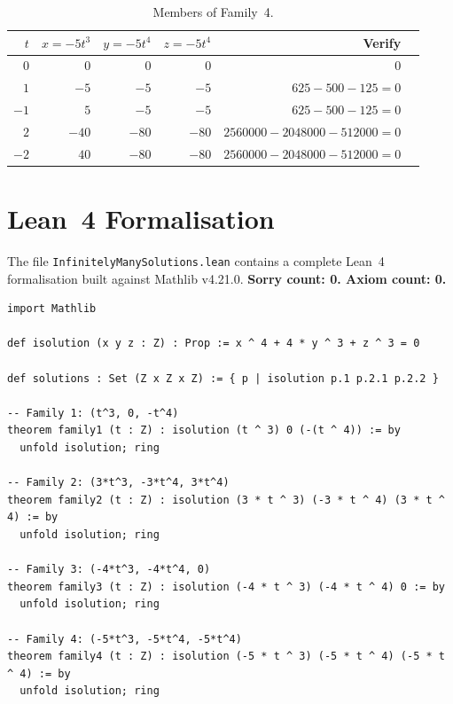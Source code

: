 \documentclass[12pt,a4paper]{article}
\theoremstyle{definition}
\begin{document}
\begin{table}[h]
\centering
\caption{Members of Family~4.}
\label{tab:family4}
\renewcommand{\arraystretch}{1.2}
\begin{tabular}{rrrrrc}
\toprule
$t$ & $x = -5t^3$ & $y = -5t^4$ & $z = -5t^4$ & Verify \\
\midrule
$0$  & $0$    & $0$    & $0$    & $0$ \\
$1$  & $-5$   & $-5$   & $-5$   & $625-500-125=0$ \\
$-1$ & $5$    & $-5$   & $-5$   & $625-500-125=0$ \\
$2$  & $-40$  & $-80$  & $-80$  & $2560000-2048000-512000=0$ \\
$-2$ & $40$   & $-80$  & $-80$  & $2560000-2048000-512000=0$ \\
\bottomrule
\end{tabular}
\end{table}

\section{Lean~4 Formalisation}\label{sec:lean}

The file \texttt{InfinitelyManySolutions.lean} contains a complete Lean~4 formalisation
built against Mathlib v4.21.0.  \textbf{Sorry count: 0.  Axiom count: 0.}

\begin{lstlisting}[language=Lean4,caption={Core definitions and family proofs.}]
import Mathlib

def isolution (x y z : Z) : Prop := x ^ 4 + 4 * y ^ 3 + z ^ 3 = 0

def solutions : Set (Z x Z x Z) := { p | isolution p.1 p.2.1 p.2.2 }

-- Family 1: (t^3, 0, -t^4)
theorem family1 (t : Z) : isolution (t ^ 3) 0 (-(t ^ 4)) := by
  unfold isolution; ring

-- Family 2: (3*t^3, -3*t^4, 3*t^4)
theorem family2 (t : Z) : isolution (3 * t ^ 3) (-3 * t ^ 4) (3 * t ^ 4) := by
  unfold isolution; ring

-- Family 3: (-4*t^3, -4*t^4, 0)
theorem family3 (t : Z) : isolution (-4 * t ^ 3) (-4 * t ^ 4) 0 := by
  unfold isolution; ring

-- Family 4: (-5*t^3, -5*t^4, -5*t^4)
theorem family4 (t : Z) : isolution (-5 * t ^ 3) (-5 * t ^ 4) (-5 * t ^ 4) := by
  unfold isolution; ring
\end{lstlisting}
\end{document}
